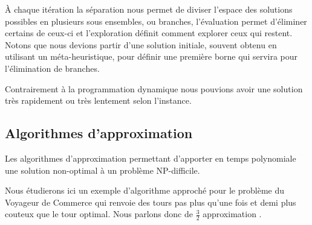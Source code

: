 À chaque itération la séparation nous permet de diviser l'espace des solutions possibles en plusieurs sous ensembles, ou branches, l'évaluation permet d'éliminer certains de ceux-ci et l'exploration définit comment explorer ceux qui restent. Notons que nous devions partir d'une solution initiale, souvent obtenu en utilisant un méta-heuristique, pour définir une première borne qui servira pour l'élimination de branches. 

Contrairement à la programmation dynamique nous pouvions avoir une solution très rapidement ou très lentement selon l'instance. 

\subsection{Algorithmes d'approximation}
Les algorithmes d'approximation permettant d'apporter en temps polynomiale une
solution non-optimal à un problème NP-difficile. 

Nous étudierons ici un exemple d'algorithme approché pour le problème du 
Voyageur de Commerce qui renvoie des tours pas plus qu'une fois et demi plus
couteux que le tour optimal. Nous parlons donc de \og $\frac{3}{2}$ approximation \fg{}.
